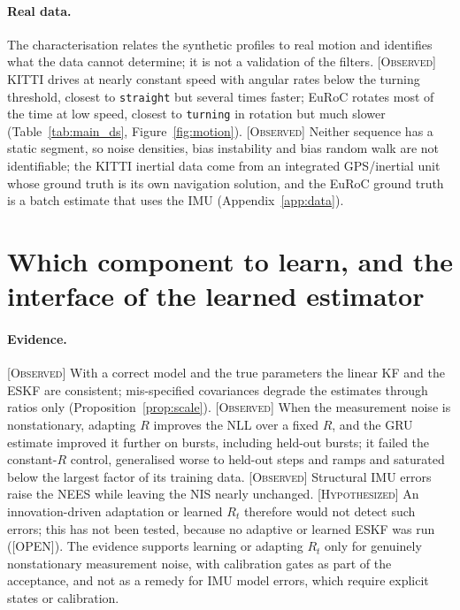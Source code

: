 \documentclass[11pt,a4paper]{article}
\newcommand{\obs}{\textsc{[Observed]}}
\newcommand{\hyp}{\textsc{[Hypothesized]}}
\newcommand{\openlbl}{\textsc{[OPEN]}}
\begin{document}
\paragraph{Real data.}

The characterisation relates the synthetic profiles to real motion and identifies what the data
cannot determine; it is not a validation of the filters. \obs{} KITTI drives at nearly constant speed
with angular rates below the turning threshold, closest to \texttt{straight} but several times
faster; EuRoC rotates most of the time at low speed, closest to \texttt{turning} in rotation but much
slower (Table~\ref{tab:main_ds}, Figure~\ref{fig:motion}). \obs{} Neither sequence has a static
segment, so noise densities, bias instability and bias random walk are not identifiable; the KITTI
inertial data come from an integrated GPS/inertial unit whose ground truth is its own navigation
solution, and the EuRoC ground truth is a batch estimate that uses the IMU (Appendix~\ref{app:data}).

\section{Which component to learn, and the interface of the learned estimator}\label{sec:which}

\paragraph{Evidence.} \obs{} With a correct model and the true parameters the linear KF and the ESKF
are consistent; mis-specified covariances degrade the estimates through ratios only
(Proposition~\ref{prop:scale}). \obs{} When the measurement noise is nonstationary, adapting $R$
improves the NLL over a fixed $R$, and the GRU estimate improved it further on bursts, including
held-out bursts; it failed the constant-$R$ control, generalised worse to held-out steps and ramps and
saturated below the largest factor of its training data. \obs{} Structural IMU errors raise the NEES while
leaving the NIS nearly unchanged. \hyp{} An innovation-driven adaptation or learned $R_t$ therefore
would not detect such errors; this has not been tested, because no adaptive or learned ESKF was run
(\openlbl). The evidence supports learning or adapting $R_t$ only for genuinely nonstationary
measurement noise, with calibration gates as part of the acceptance, and not as a remedy for IMU
model errors, which require explicit states or calibration.
\end{document}
